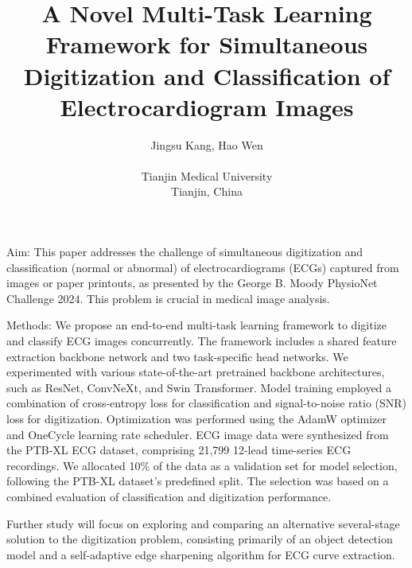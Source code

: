 \documentclass{cinc-abstract}
\begin{document}
\title{A Novel Multi-Task Learning Framework for Simultaneous Digitization and Classification of Electrocardiogram Images}

\author {Jingsu Kang, Hao Wen\\ %
\ \\ %
Tianjin Medical University\\  %
Tianjin, China} %

\maketitle



Aim: This paper addresses the challenge of simultaneous digitization and classification (normal or abnormal) of electrocardiograms (ECGs) captured from images or paper printouts, as presented by the George B. Moody PhysioNet Challenge 2024. This problem is crucial in medical image analysis.

Methods: We propose an end-to-end multi-task learning framework to digitize and classify ECG images concurrently. The framework includes a shared feature extraction backbone network and two task-specific head networks. We experimented with various state-of-the-art pretrained backbone architectures, such as ResNet, ConvNeXt, and Swin Transformer. Model training employed a combination of cross-entropy loss for classification and signal-to-noise ratio (SNR) loss for digitization. Optimization was performed using the AdamW optimizer and OneCycle learning rate scheduler. ECG image data were synthesized from the PTB-XL ECG dataset, comprising 21,799 12-lead time-series ECG recordings. We allocated 10\% of the data as a validation set for model selection, following the PTB-XL dataset's predefined split. The selection was based on a combined evaluation of classification and digitization performance.

Further study will focus on exploring and comparing an alternative several-stage solution to the digitization problem, consisting primarily of an object detection model and a self-adaptive edge sharpening algorithm for ECG curve extraction.
\end{document}

